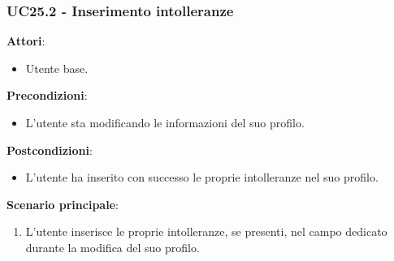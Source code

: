 \subsubsection{UC25.2 - Inserimento intolleranze}\label{usecase:25_2}
\textbf{Attori}:
\begin{itemize}
    \item Utente base.
\end{itemize}
\textbf{Precondizioni}:
\begin{itemize}
    \item L'utente sta modificando le informazioni del suo profilo.
\end{itemize}
\textbf{Postcondizioni}:
\begin{itemize}
    \item L'utente ha inserito con successo le proprie intolleranze nel suo profilo.
\end{itemize}
\textbf{Scenario principale}:
\begin{enumerate}
    \item L'utente inserisce le proprie intolleranze, se presenti, nel campo dedicato durante la modifica del suo profilo.
\end{enumerate}

 

\newpage